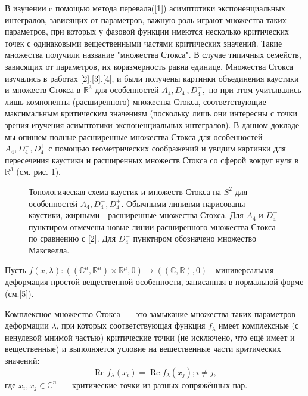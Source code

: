 \vzmscaption

В изучении c помощью метода перевала([1]) асимптотики экспоненциальных интегралов, зависящих от параметров, важную роль играют множества таких параметров, при которых у фазовой функции имеются несколько критических точек с одинаковыми вещественными частями критических значений. Такие множества получили название "множества Стокса". В случае типичных семейств, зависящих от параметров, их коразмерность равна единице. Множества Стокса изучались в работах [2],[3],[4], и были получены картинки объединения каустики и множеств Стокса в $\mathbb{R}^3$ для особенностей $A_{4}, D_{4}^-, D_{4}^+, $ но при этом учитывались лишь компоненты (расширенного) множества Стокса, соответствующие максимальным критическим значениям (поскольку лишь они интересны с точки зрения изучения асимптотики экспоненциальных интегралов). В данном докладе мы опишем полные расширенные множества Стокса для особенностей $A_{4}, D_{4}^-, D_{4}^+ $ с помощью геометрических соображений и увидим картинки для пересечения каустики и расширенных множеств Стокса со сферой вокруг нуля в $\mathbb{R}^3$ (см. рис. 1).

	\begin{figure}
		\caption{Топологическая схема каустик и множеств Стокса на $S^2$ для особенностей $A_{4}, D_{4}^-, D_{4}^+ $. Обычными линиями нарисованы каустики, жирными - расширенные множества Стокса. Для $A_4$ и $D_4^+$ пунктиром отмечены новые линии расширенного множества Стокса по сравнению с [2].  Для $ D_{4}^-$ пунктиром обозначено множество Максвелла.}\label{F7}
	\end{figure}


Пусть $f(x,\lambda):((\mathbb{C}^n,\mathbb{R}^n)\times\mathbb{R}^\mu,0)\rightarrow((\mathbb{C},\mathbb{R}),0)$ - миниверсальная деформация простой вещественной особенности, записанная в нормальной форме (см.[5]).


\begin{definition}
	Комплексное множество Стокса~--- это замыкание множества таких параметров деформации $\lambda$,
	при которых соответствующая функция $f_\lambda$ имеет комплексные (с ненулевой мнимой частью)
	критические точки (не исключено, что ещё имеет и вещественные)
	и выполняется условие на вещественные части критических значений:
	$$\mathop{\text{Re}}f_\lambda(x_i)=\mathop{\text{Re}}f_\lambda(x_j);  i\neq j,$$
	где $x_i,x_j\in\mathbb{C}^n$~--- критические точки из разных сопряжённых пар.
\end{definition}

